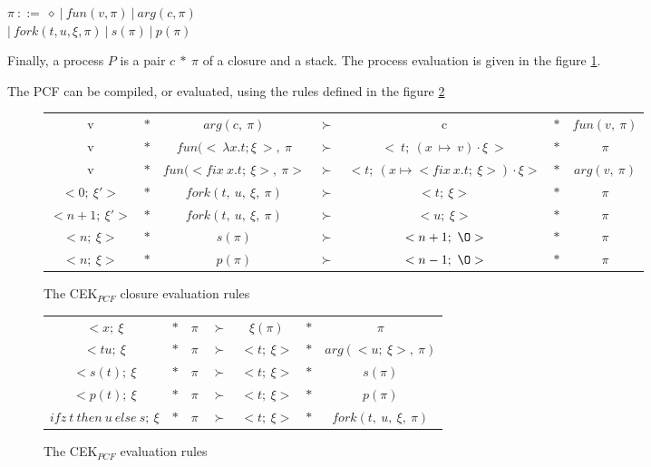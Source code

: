\documentclass[a4paper,12pt]{article}
\begin{document}
\begin{center}
  $\pi~::=~\diamond~|~fun(v, \pi)~|~arg(c, \pi)$ \\
  $|~fork(t,u,\xi,\pi)~|~s(\pi)~|~p(\pi)$
\end{center}

Finally, a process $P$ is a pair $c~*~\pi$ of a closure and a stack. The process
evaluation is given in the figure \ref{cek-eval-closure}.

The PCF can be compiled, or evaluated, using the rules defined in the figure \ref{cek-eval-rules}

\begin{figure}[ht]
  \begin{center}
    \begin{tabular}{|c c c c c c c|}
      \hline
      v & $*$ & $arg(c,~\pi)$ & $\succ$ & c & $*$ & $fun(v,~\pi)$ \\
      v & $*$ & $fun(<~\lambda x.t;\xi~>,~\pi$ & $\succ$ &
      $<~t;~(x~\mapsto~v)\cdot \xi~>$ 
      & $*$ & $\pi$ \\
      v & $*$ & $fun(<fix~x.t;~\xi>,~\pi>$ & $\succ$ &
      $<t;~(x\mapsto <fix~x.t;~\xi>) \cdot \xi>$ & $*$ & $arg(v,~\pi)$ \\
      $<0;~\xi'>$ & $*$ & $fork(t,~u,~\xi,~\pi)$ & $\succ$ &
      $<t;~\xi>$ & $*$ & $\pi$ \\
      $<n+1;~\xi'>$ & $*$ & $fork(t,~u,~\xi,~\pi)$ & $\succ$ &
      $<u;~\xi>$ & $*$ & $\pi$ \\
      $<n;~\xi>$ & $*$ & $s(\pi)$ & $\succ$ &
      $<n+1;~\O>$ & $*$ & $\pi$ \\
      $<n;~\xi>$ & $*$ & $p(\pi)$ & $\succ$ &
      $<n-1;~\O>$ & $*$ & $\pi$ \\
      \hline
    \end{tabular}
  \end{center}
  \caption{The CEK$_{PCF}$ closure evaluation rules}
  \label{cek-eval-closure}
\end{figure}


\begin{figure}
  \begin{center}
    \begin{tabular}{|c c c c c c c|}
      \hline
      $<x;~\xi$ & $*$ & $\pi$ & $\succ$ & $\xi(\pi)$ & $*$ & $\pi$ \\
      $<tu;~\xi$ & $*$ & $\pi$ & $\succ$ & $<t;~\xi>$ & $*$ & 
      $arg(<u;~\xi>,~\pi)$ \\
      $<s(t);~\xi$ & $*$ & $\pi$ & $\succ$ & $<t;~\xi>$ & $*$ & 
      $s(\pi)$ \\
      $<p(t);~\xi$ & $*$ & $\pi$ & $\succ$ & $<t;~\xi>$ & $*$ & 
      $p(\pi)$ \\
      $ifz~t~then~u~else~s;~\xi$ 
      & $*$ & $\pi$ & $\succ$ & $<t;~\xi>$ & $*$ & 
      $fork(t,~u,~\xi,~\pi)$ \\
      \hline
    \end{tabular}
  \end{center}
  \caption{The CEK$_{PCF}$ evaluation rules}
  \label{cek-eval-rules}
\end{figure}




\end{document}

